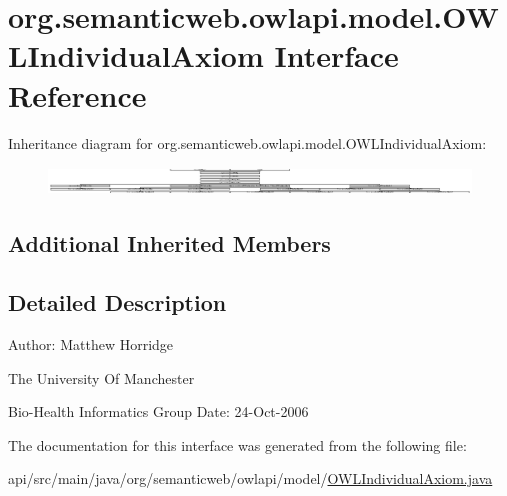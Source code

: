 \hypertarget{interfaceorg_1_1semanticweb_1_1owlapi_1_1model_1_1_o_w_l_individual_axiom}{\section{org.\-semanticweb.\-owlapi.\-model.\-O\-W\-L\-Individual\-Axiom Interface Reference}
\label{interfaceorg_1_1semanticweb_1_1owlapi_1_1model_1_1_o_w_l_individual_axiom}
}
Inheritance diagram for org.\-semanticweb.\-owlapi.\-model.\-O\-W\-L\-Individual\-Axiom\-:\begin{figure}[H]
\begin{center}
\leavevmode
\includegraphics[height=0.748538cm]{interfaceorg_1_1semanticweb_1_1owlapi_1_1model_1_1_o_w_l_individual_axiom}
\end{center}
\end{figure}
\subsection*{Additional Inherited Members}


\subsection{Detailed Description}
Author\-: Matthew Horridge\par
 The University Of Manchester\par
 Bio-\/\-Health Informatics Group Date\-: 24-\/\-Oct-\/2006 

The documentation for this interface was generated from the following file\-:\begin{DoxyCompactItemize}
\item 
api/src/main/java/org/semanticweb/owlapi/model/\hyperlink{_o_w_l_individual_axiom_8java}{O\-W\-L\-Individual\-Axiom.\-java}\end{DoxyCompactItemize}
